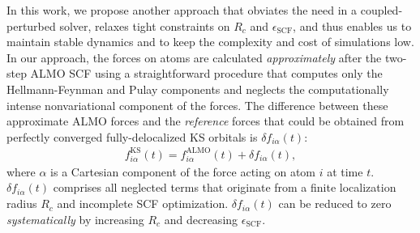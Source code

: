 \documentclass[aps,prl,reprint,amsmath,amssymb]{revtex4-1}
\begin{document}
In this work, we propose another approach that obviates the need in a coupled-perturbed solver, relaxes tight constraints on $R_{c}$ and $\epsilon_{\text{SCF}}$, and thus enables us to maintain stable dynamics and to keep the complexity and cost of simulations low. 
%
In our approach, the forces on atoms are calculated \emph{approximately} after the two-step ALMO SCF using a straightforward procedure that computes only the Hellmann-Feynman and Pulay components and neglects the computationally intense nonvariational component of the forces. 
The difference between these approximate ALMO forces and the \emph{reference} forces that could be obtained from perfectly converged fully-delocalized KS orbitals is $\delta f_{i\alpha}(t)$:
%
\begin{align}
\label{eq:deltaf}
f^{\text{KS}}_{i\alpha}(t) = f^{\text{ALMO}}_{i\alpha}(t) + \delta f_{i\alpha} (t),
\end{align}
%
where $\alpha$ is a Cartesian component of the force acting on atom $i$ at time $t$. $\delta f_{i\alpha} (t)$ comprises all neglected terms that originate from a finite localization radius $R_c$ and incomplete SCF optimization. 
$\delta f_{i\alpha} (t)$ can be reduced to zero \emph{systematically} by increasing $R_c$ and decreasing $\epsilon_{\text{SCF}}$.
\end{document}
